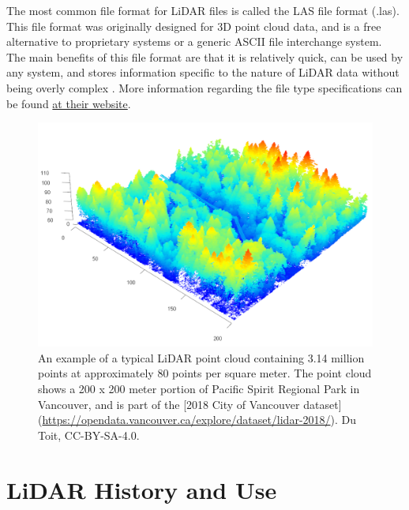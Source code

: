\documentclass[
]{book}
\begin{document}
The most common file format for LiDAR files is called the LAS file format (.las). This file format was originally designed for 3D point cloud data, and is a free alternative to proprietary systems or a generic ASCII file interchange system. The main benefits of this file format are that it is relatively quick, can be used by any system, and stores information specific to the nature of LiDAR data without being overly complex \citep{american_society_for_photogrammetry__remote_sensing_laser_2019}. More information regarding the file type specifications can be found \href{https://www.asprs.org/divisions-committees/lidar-division/laser-las-file-format-exchange-activities}{at their website}.



\begin{figure}
\includegraphics[width=0.75\linewidth]{images/15-las-denoise} \caption{An example of a typical LiDAR point cloud containing 3.14 million points at approximately 80 points per square meter. The point cloud shows a 200 x 200 meter portion of Pacific Spirit Regional Park in Vancouver, and is part of the {[}2018 City of Vancouver dataset{]} (\url{https://opendata.vancouver.ca/explore/dataset/lidar-2018/}). Du Toit, CC-BY-SA-4.0.}\label{fig:15-las-denoise}
\end{figure}

\section{LiDAR History and Use}\label{lidar-history-and-use}
\end{document}
